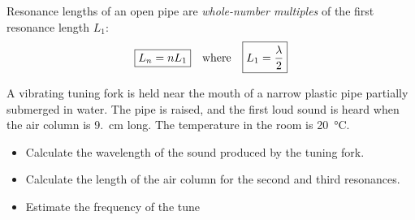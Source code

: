 %  
%
%
%
%
%
Resonance lengths of an open pipe are \emph{whole-number multiples} of the
first resonance length $L_1$:
\begin{equation}
  \boxed{L_n=nL_1}
  \quad\text{\normalsize where}\quad
  \boxed{L_1=\frac\lambda2}
\end{equation}
%
%
%
%
\begin{example}
  A vibrating tuning fork is held near the mouth of a narrow plastic pipe
  partially submerged in water. The pipe is raised, and the first loud sound is
  heard when the air column is \SI{9.}{\centi\metre} long. The temperature in
  the room is \SI{20}\celsius.
  \begin{itemize}
  \item Calculate the wavelength of the sound produced by the tuning fork.
  \item Calculate the length of the air column for the second and third
    resonances.
  \item Estimate the frequency of the tune
  \end{itemize}
\end{example}



